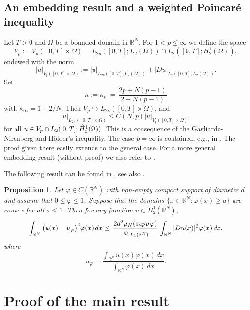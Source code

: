 \documentclass[10pt]{article}
\newtheorem{prop}{Proposition}[section]
\newcommand{\iR}{\mathbb{R}}
\newcommand{\oH}{\hspace*{0.39em}\raisebox{0.6ex}{\textdegree}\hspace{-0.72em}H}
\begin{document}
\subsection{An embedding result and a weighted Poincar\'e inequality}
Let $T>0$ and $\Omega$ be a bounded domain in $\iR^N$. For $1<p\le
\infty$ we define the space
\begin{equation} \label{Vdef}
V_p:=V_p([0,T]\times \Omega)=L_{2p}([0,T];L_2(\Omega))\cap
L_2([0,T];H^1_2(\Omega)),
\end{equation}
endowed with the norm
\[
|u|_{V_p([0,T]\times \Omega)}:=|u|_{L_{2p}([0,T];L_2(\Omega))}
+|Du|_{L_2([0,T];L_2(\Omega))}.
\]
Set
\begin{equation} \label{kappa}
\kappa:=\kappa_p:=\,\frac{2p+N(p-1)}{2+N(p-1)}
\end{equation}
with $\kappa_\infty=1+2/N$. Then $V_p\hookrightarrow
L_{2\kappa}([0,T]\times\Omega)$, and
\begin{equation} \label{Vembedding}
|u|_{L_{2\kappa}([0,T]\times\Omega)}\le C(N,p)|u|_{V_p([0,T]\times
\Omega)},
\end{equation}
for all $u\in V_p\cap L_2([0,T];\oH^1_2(\Omega))$. This is a
consequence of the Gagliardo-Nirenberg and H\"older's inequality.
The case $p=\infty$ is contained, e.g., in \cite[p.\ 74 and
75]{LSU}. The proof given there easily extends to the general case.
For a more general embedding result (without proof) we also refer to
\cite[Section 2]{Za2}.

The following result can be found in \cite[Lemma 3]{Moser64}, see
also \cite[Lemma 6.12]{Lm}.
\begin{prop} \label{WeiPI}
Let $\varphi\in C(\iR^N)$ with non-empty compact support of diameter
$d$ and assume that $0\le \varphi\le 1$. Suppose that the domains
$\{x\in\iR^N:\varphi(x)\ge a\}$ are convex for all $a\le 1$. Then
for any function $u\in H^{1}_2(\iR^N)$,
\[
\int_{\iR^N} \big(u(x)-u_\varphi\big)^2 \varphi(x)\,dx \le \,\frac{2
d^2\mu_N(\mbox{{\em supp}}\,\varphi)}{|\varphi|_{L_1(\iR^N)}}\,
\int_{\iR^N} |Du(x)|^2 \varphi(x)\,dx,
\]
where
\[
u_\varphi=\frac{\int_{\iR^N} u(x)\varphi(x)\,dx}{\int_{\iR^N}
\varphi(x)\,dx}.
\]
\end{prop}
\section{Proof of the main result}
\end{document}
